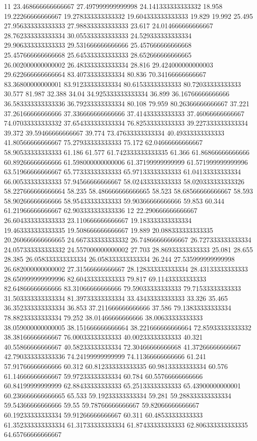 11 23.468666666666667 27.497999999999998 24.141333333333332 18.958 19.22266666666667 19.278333333333332 19.604333333333333 19.829 19.992 25.495 27.956333333333333 27.988333333333333 23.617 24.014666666666667 28.762333333333334 30.055333333333333 24.529333333333334 29.906333333333333 29.531666666666666 25.457666666666668 25.457666666666668 25.645333333333333 28.652666666666665 26.002000000000002 26.483333333333334 28.816 29.424000000000003 29.622666666666664 83.40733333333334 80.836 70.34166666666667 83.36800000000001 83.91233333333334 80.61533333333333 80.72033333333333 30.577 81.987 32.388 34.04 34.925333333333334 36.899 36.16766666666666 36.583333333333336 36.79233333333334 80.108 79.959 80.26366666666667 37.221 37.26166666666666 37.336666666666666 37.41433333333333 37.46066666666667 74.07033333333332 37.654333333333334 76.82533333333333 39.227333333333334 39.372 39.59466666666667 39.774 73.47633333333334 40.49333333333333 41.80566666666667 75.27933333333333 75.172 62.04666666666667 58.90533333333333 61.186 61.577 61.742333333333335 61.366 61.86866666666666 60.89266666666666 61.598000000000006 61.37199999999999 61.571999999999996 63.51966666666667 65.77333333333333 65.97133333333333 61.04133333333334 66.00533333333333 57.94566666666667 58.02433333333333 58.020333333333326 58.227666666666664 58.235 58.486666666666665 58.523 58.68566666666667 58.593 58.90266666666666 58.95433333333333 59.90366666666666 59.853 60.344 61.21966666666667 62.903333333333336
12 22.290666666666667 26.604333333333333 23.110666666666667 19.183333333333334 19.463333333333335 19.508666666666667 19.889 20.088333333333335 20.260666666666665 24.667333333333332 26.74866666666667 26.727333333333334 24.057333333333332 24.557000000000002 27.703 28.86933333333333 25.081 28.655 28.385 26.058333333333334 26.058333333333334 26.244 27.535999999999998 26.682000000000002 27.31566666666667 28.128333333333334 28.43133333333333 28.650999999999996 82.60433333333333 79.817 69.11433333333333 82.64866666666666 83.31066666666666 79.59033333333333 79.71533333333333 31.503333333333334 81.39733333333334 33.43433333333333 33.326 35.465 36.352333333333334 36.853 37.211666666666666 37.586 79.13833333333334 78.88233333333334 79.252 38.01466666666666 38.00633333333333 38.059000000000005 38.151666666666664 38.221666666666664 72.85933333333332 38.38166666666667 76.00033333333333 40.00233333333333 40.321 40.55866666666667 40.58233333333334 72.30466666666668 41.37266666666667 42.790333333333336 74.24199999999999 74.11366666666666 61.241 57.91766666666666 60.312 60.812333333333335 60.98133333333334 60.576 61.14666666666667 59.97233333333334 60.784 60.55766666666666 60.84199999999999 62.88433333333333 65.25133333333333 65.43900000000001 60.236666666666665 65.533 59.19233333333334 59.281 59.288333333333334 59.54366666666666 59.55 59.78766666666667 59.82066666666667 60.19233333333334 59.91266666666667 60.311 60.48533333333333 61.352333333333334 61.31733333333334 61.87433333333333 62.806333333333335 64.65766666666667
